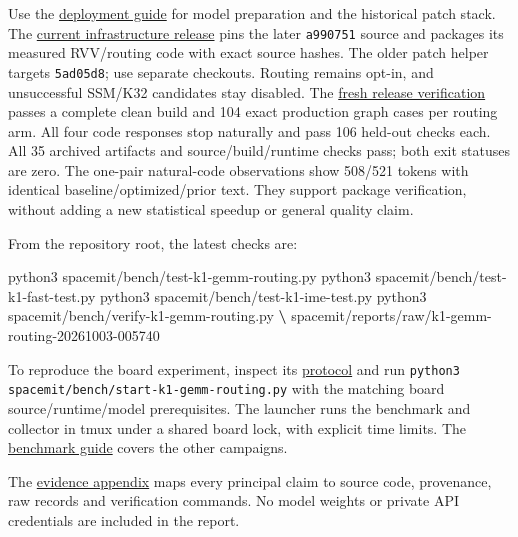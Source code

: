 \documentclass[10pt,a4paper]{article}
\newenvironment{Shaded}{}{}
\newcommand{\ExtensionTok}[1]{#1}
\newcommand{\KeywordTok}[1]{\textcolor[rgb]{0.00,0.44,0.13}{\textbf{#1}}}
\newcommand{\NormalTok}[1]{#1}
\begin{document}
Use the
\href{https://github.com/MoyaMryia/riscv-accl/blob/main/spacemit/README.md}{deployment
guide} for model preparation and the historical patch stack. The
\href{https://github.com/MoyaMryia/riscv-accl/blob/main/spacemit/release/README.md}{current
infrastructure release} pins the later \nolinkurl{a990751} source and
packages its measured RVV/routing code with exact source hashes. The
older patch helper targets \nolinkurl{5ad05d8}; use separate checkouts.
Routing remains opt-in, and unsuccessful SSM/K32 candidates stay
disabled. The
\href{https://github.com/MoyaMryia/riscv-accl/blob/main/spacemit/reports/2026-10-07-release-verification.md}{fresh
release verification} passes a complete clean build and 104 exact
production graph cases per routing arm. All four code responses stop
naturally and pass 106 held-out checks each. All 35 archived artifacts
and source/build/runtime checks pass; both exit statuses are zero. The
one-pair natural-code observations show 508/521 tokens with identical
baseline/optimized/prior text. They support package verification,
without adding a new statistical speedup or general quality claim.

From the repository root, the latest checks are:

\begin{Shaded}
\begin{Highlighting}[]
\ExtensionTok{python3}\NormalTok{ spacemit/bench/test{-}k1{-}gemm{-}routing.py}
\ExtensionTok{python3}\NormalTok{ spacemit/bench/test{-}k1{-}fast{-}test.py}
\ExtensionTok{python3}\NormalTok{ spacemit/bench/test{-}k1{-}ime{-}test.py}
\ExtensionTok{python3}\NormalTok{ spacemit/bench/verify{-}k1{-}gemm{-}routing.py }\KeywordTok{\textbackslash{}}
  \ExtensionTok{spacemit/reports/raw/k1{-}gemm{-}routing{-}20261003{-}005740}
\end{Highlighting}
\end{Shaded}

To reproduce the board experiment, inspect its
\href{https://github.com/MoyaMryia/riscv-accl/blob/main/spacemit/experiments/2026-10-03-gemm-routing.md}{protocol}
and run \nolinkurl{python3 spacemit/bench/start-k1-gemm-routing.py} with
the matching board source/runtime/model prerequisites. The launcher runs
the benchmark and collector in tmux under a shared board lock, with
explicit time limits. The
\href{https://github.com/MoyaMryia/riscv-accl/blob/main/spacemit/bench/README.md}{benchmark
guide} covers the other campaigns.

The
\href{https://github.com/MoyaMryia/riscv-accl/blob/main/spacemit/reports/SUBMISSION-EVIDENCE.md}{evidence
appendix} maps every principal claim to source code, provenance, raw
records and verification commands. No model weights or private API
credentials are included in the report.
\end{document}
